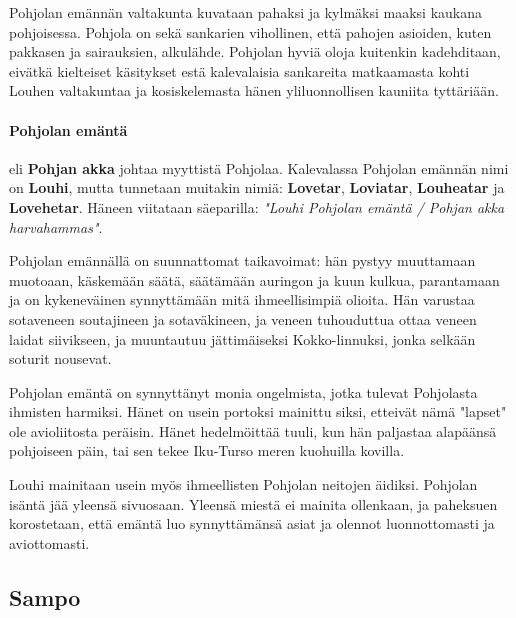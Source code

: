   Pohjolan emännän valtakunta kuvataan pahaksi ja kylmäksi maaksi kaukana pohjoisessa. Pohjola
  on sekä sankarien vihollinen, että pahojen asioiden, kuten pakkasen ja sairauksien, alkulähde.
  Pohjolan hyviä oloja kuitenkin kadehditaan, eivätkä kielteiset käsitykset estä kalevalaisia
  sankareita matkaamasta kohti Louhen valtakuntaa ja kosiskelemasta hänen yliluonnollisen kauniita
  tyttäriään.

  \paragraph{Pohjolan emäntä} eli \textbf{Pohjan akka} johtaa myyttistä Pohjolaa. Kalevalassa
  Pohjolan emännän nimi on \textbf{Louhi}, mutta tunnetaan muitakin nimiä: \textbf{Lovetar},
  \textbf{Loviatar}, \textbf{Louheatar} ja \textbf{Lovehetar}. Häneen viitataan säeparilla:
  \emph{"Louhi Pohjolan emäntä / Pohjan akka harvahammas"}.
  \par
  Pohjolan emännällä on suunnattomat taikavoimat: hän pystyy muuttamaan muotoaan, käskemään säätä,
  säätämään auringon ja kuun kulkua, parantamaan ja on kykeneväinen synnyttämään mitä
  ihmeellisimpiä olioita. Hän varustaa sotaveneen soutajineen ja sotaväkineen, ja veneen
  tuhouduttua ottaa veneen laidat siivikseen, ja muuntautuu jättimäiseksi Kokko-linnuksi, jonka
  selkään soturit nousevat.
  \par
  Pohjolan emäntä on synnyttänyt monia ongelmista, jotka tulevat Pohjolasta ihmisten harmiksi.
  Hänet on usein portoksi mainittu siksi, etteivät nämä "lapset" ole avioliitosta peräisin. Hänet
  hedelmöittää tuuli, kun hän paljastaa alapäänsä pohjoiseen päin, tai sen tekee Iku-Turso meren
  kuohuilla kovilla.
  \par
  Louhi mainitaan usein myös ihmeellisten Pohjolan neitojen äidiksi. Pohjolan isäntä jää yleensä
  sivuosaan. Yleensä miestä ei mainita ollenkaan, ja paheksuen korostetaan, että emäntä luo
  synnyttämänsä asiat ja olennot luonnottomasti ja aviottomasti.


\subsection{Sampo}


